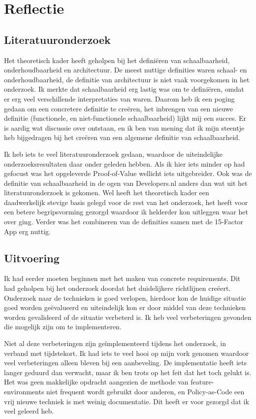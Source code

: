 \chapter{Reflectie}

\label{Reflectie}

\section{Literatuuronderzoek}
Het theoretisch kader heeft geholpen bij het definiëren van schaalbaarheid, onderhoudbaarheid en architectuur. De meest nuttige definities waren schaal- en onderhoudbaarheid, de definitie van architectuur is niet vaak voorgekomen in het onderzoek. Ik merkte dat schaalbaarheid erg lastig was om te definiëren, omdat er erg veel verschillende interpretaties van waren. Daarom heb ik een poging gedaan om een concretere definitie te creëren, het inbrengen van een nieuwe definitie (functionele, en niet-functionele schaalbaarheid) lijkt mij een succes. Er is aardig wat discussie over ontstaan, en ik ben van mening dat ik mijn steentje heb bijgedragen bij het creëren van een algemene definitie van schaalbaarheid.

Ik heb iets te veel literatuuronderzoek gedaan, waardoor de uiteindelijke onderzoeksresultaten daar onder geleden hebben. Als ik hier iets minder op had gefocust was het opgeleverde Proof-of-Value wellicht iets uitgebreider. Ook was de definitie van schaalbaarheid in de ogen van Developers.nl anders dan wat uit het literatuuronderzoek is gekomen. Wel heeft het theoretisch kader een daadwerkelijk stevige basis gelegd voor de rest van het onderzoek, het heeft voor een betere begripsvorming gezorgd waardoor ik helderder kon uitleggen waar het over ging. Verder was het combineren van de definities samen met de 15-Factor App erg nuttig.

\section{Uitvoering}
Ik had eerder moeten beginnen met het maken van concrete requirements. Dit had geholpen bij het onderzoek doordat het duidelijkere richtlijnen creëert. Onderzoek naar de technieken is goed verlopen, hierdoor kon de huidige situatie goed worden geëvalueerd en uiteindelijk kon er door middel van deze technieken worden gevalideerd of de situatie verbeterd is. Ik heb veel verbeteringen gevonden die mogelijk zijn om te implementeren. 

Niet al deze verbeteringen zijn geïmplementeerd tijdens het onderzoek, in verband met tijdstekort. Ik had iets te veel hooi op mijn vork genomen waardoor veel verbeteringen alleen bleven bij een aanbeveling. De implementatie heeft iets langer geduurd dan verwacht, maar ik ben trots op het feit dat het toch gelukt is. Het was geen makkelijke opdracht aangezien de methode van feature-environments niet frequent wordt gebruikt door anderen, en Policy-as-Code een vrij nieuwe techniek is met weinig documentatie. Dit heeft er voor gezorgd dat ik veel geleerd heb.

